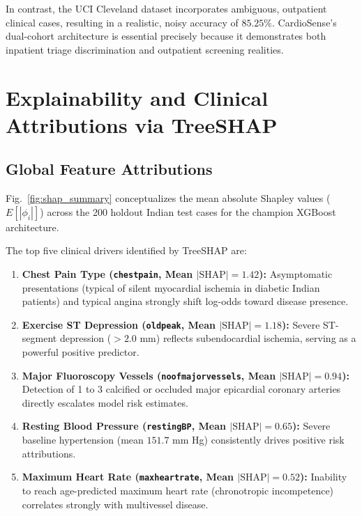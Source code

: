 \documentclass[conference]{IEEEtran}
\begin{document}
In contrast, the UCI Cleveland dataset incorporates ambiguous, outpatient clinical cases, resulting in a realistic, noisy accuracy of $85.25\%$. CardioSense's dual-cohort architecture is essential precisely because it demonstrates both inpatient triage discrimination and outpatient screening realities.

\section{Explainability and Clinical Attributions via TreeSHAP}

\subsection{Global Feature Attributions}
Fig.~\ref{fig:shap_summary} conceptualizes the mean absolute Shapley values ($E[|\phi_i|]$) across the 200 holdout Indian test cases for the champion XGBoost architecture.

The top five clinical drivers identified by TreeSHAP are:
\begin{enumerate}
    \item \textbf{Chest Pain Type (\texttt{chestpain}, Mean $|\text{SHAP}| = 1.42$):} Asymptomatic presentations (typical of silent myocardial ischemia in diabetic Indian patients) and typical angina strongly shift log-odds toward disease presence.
    \item \textbf{Exercise ST Depression (\texttt{oldpeak}, Mean $|\text{SHAP}| = 1.18$):} Severe ST-segment depression ($>2.0$ mm) reflects subendocardial ischemia, serving as a powerful positive predictor.
    \item \textbf{Major Fluoroscopy Vessels (\texttt{noofmajorvessels}, Mean $|\text{SHAP}| = 0.94$):} Detection of 1 to 3 calcified or occluded major epicardial coronary arteries directly escalates model risk estimates.
    \item \textbf{Resting Blood Pressure (\texttt{restingBP}, Mean $|\text{SHAP}| = 0.65$):} Severe baseline hypertension (mean $151.7$ mm Hg) consistently drives positive risk attributions.
    \item \textbf{Maximum Heart Rate (\texttt{maxheartrate}, Mean $|\text{SHAP}| = 0.52$):} Inability to reach age-predicted maximum heart rate (chronotropic incompetence) correlates strongly with multivessel disease.
\end{enumerate}
\end{document}
